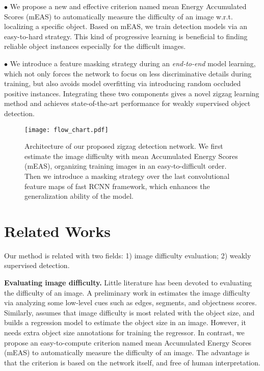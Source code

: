 \documentclass[10pt,twocolumn,letterpaper]{article}
\begin{document}
$\bullet$ We propose a new and effective criterion named mean Energy Accumulated Scores (mEAS) to automatically measure the difficulty of an image w.r.t. localizing a specific object. Based on mEAS, we train detection models via an easy-to-hard strategy. This kind of progressive learning is beneficial to finding reliable object instances especially for the difficult images.

$\bullet$ We introduce a feature masking strategy during an \emph{end-to-end} model learning, which not only forces the network to focus on less discriminative details during training, but also avoids model overfitting via introducing random occluded positive instances. Integrating these two components gives a novel zigzag learning method and achieves state-of-the-art performance for weakly supervised object detection.

\begin{figure*}[t]
  \centering
\texttt{[image: flow\_chart.pdf]} \\
   \vspace{0.1cm}
  \caption{Architecture of our proposed zigzag detection network. We first estimate the image difficulty with mean Accumulated Energy Scores (mEAS), organizing training images in an easy-to-difficult order. Then we introduce a masking strategy over the last convolutional feature maps of fast RCNN framework, which enhances the generalization ability of the model.} \label{flow_chart}
  \vspace{-0.1cm}
\end{figure*}

\section{Related Works}
Our method is related with two fields: 1) image difficulty evaluation; 2) weakly supervised detection. 

\textbf{Evaluating image difficulty.} Little literature has been devoted to evaluating the difficulty of an image. A preliminary work in \cite{tudor2016hard} estimates the image difficulty via analyzing some low-level cues such as edges, segments, and objectness scores. Similarly,  \cite{shi2016weakly} assumes that image difficulty is most related with the object size, and builds a regression model to estimate the object size in an image. However, it needs extra object size annotations for training the regressor. In contrast, we propose an easy-to-compute criterion named mean Accumulated Energy Scores (mEAS) to automatically measure the difficulty of an image. The advantage is that the criterion is based on the network itself, and free of human interpretation. 
\end{document}
